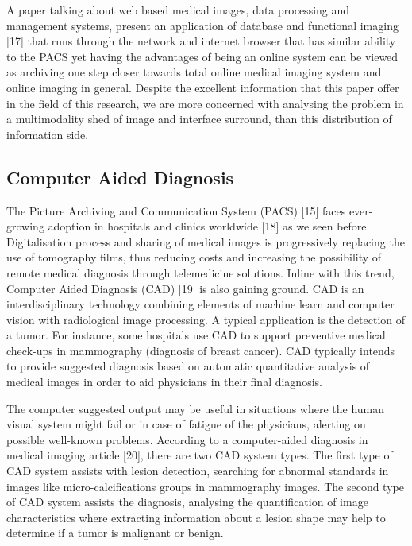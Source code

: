 A paper talking about web based medical images, data processing and management systems, present an application of database and functional imaging [17] that runs through the network and internet browser that has similar ability to the PACS yet having the advantages of being an online system can be viewed as archiving one step closer towards total online medical imaging system and online imaging in general. Despite the excellent information that this paper offer in the field of this research, we are more concerned with analysing the problem in a multimodality shed of image and interface surround, than this distribution of information side.

\subsection{Computer Aided Diagnosis}

The Picture Archiving and Communication System (PACS) [15] faces ever-growing adoption in hospitals and clinics worldwide [18] as we seen before. Digitalisation process and sharing of medical images is progressively replacing the use of tomography films, thus reducing costs and increasing the possibility of remote medical diagnosis through telemedicine solutions. Inline with this trend, Computer Aided Diagnosis (CAD) [19] is also gaining ground. CAD is an interdisciplinary technology combining elements of machine learn and computer vision with radiological image processing. A typical application is the detection of a tumor. For instance, some hospitals use CAD to support preventive medical check-ups in mammography (diagnosis of breast cancer). CAD typically intends to provide suggested diagnosis based on automatic quantitative analysis of medical images in order to aid physicians in their final diagnosis.

The computer suggested output may be useful in situations where the human visual system might fail or in case of fatigue of the physicians, alerting on possible well-known problems. According to a computer-aided diagnosis in medical imaging article [20], there are two CAD system types. The first type of CAD system assists with lesion detection, searching for abnormal standards in images like micro-calcifications groups in mammography images. The second type of CAD system assists the diagnosis, analysing the quantification of image characteristics where extracting information about a lesion shape may help to determine if a tumor is malignant or benign.

\clearpage

